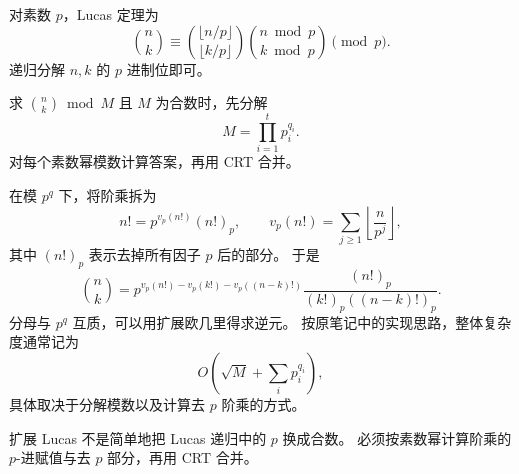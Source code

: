 对素数 $p$，Lucas 定理为
\[
  \binom nk\equiv
  \binom{\lfloor n/p\rfloor}{\lfloor k/p\rfloor}
  \binom{n\bmod p}{k\bmod p}\pmod p.
\]
递归分解 $n,k$ 的 $p$ 进制位即可。

求 $\binom nk\bmod M$ 且 $M$ 为合数时，先分解
\[
  M=\prod_{i=1}^{t}p_i^{q_i}.
\]
对每个素数幂模数计算答案，再用 CRT 合并。

在模 $p^q$ 下，将阶乘拆为
\[
  n!=p^{v_p(n!)}(n!)_p,
  \qquad
  v_p(n!)=\sum_{j\ge1}\left\lfloor\frac{n}{p^j}\right\rfloor,
\]
其中 $(n!)_p$ 表示去掉所有因子 $p$ 后的部分。
于是
\[
  \binom nk=
  p^{v_p(n!)-v_p(k!)-v_p((n-k)!)}
  \frac{(n!)_p}{(k!)_p((n-k)!)_p}.
\]
分母与 $p^q$ 互质，可以用扩展欧几里得求逆元。
按原笔记中的实现思路，整体复杂度通常记为
\[
  O\!\left(\sqrt M+\sum_i p_i^{q_i}\right),
\]
具体取决于分解模数以及计算去 $p$ 阶乘的方式。

\begin{icpcwarning}[命名与前提]
  扩展 Lucas 不是简单地把 Lucas 递归中的 $p$ 换成合数。
  必须按素数幂计算阶乘的 $p$-进赋值与去 $p$ 部分，再用 CRT 合并。
\end{icpcwarning}
